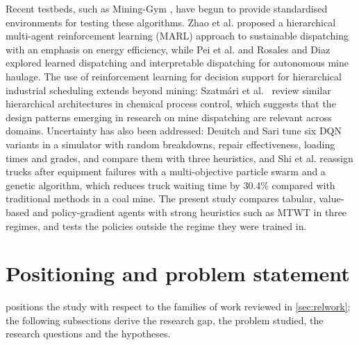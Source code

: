 \documentclass[11pt,a4paper]{article}
\newif\ifrevmarks
\newcommand{\revtag}[1]{\ifrevmarks\textsuperscript{\textcolor{red!70!black}{\scriptsize[#1]}}\fi}
\newcommand{\rev}[2]{\ifrevmarks{\color{revcolor}#2}\revtag{#1}\else#2\fi}
\newenvironment{revbloc}[1]{\par\ifrevmarks\color{revcolor}\noindent\revtag{#1}\ \fi}{\par}
\newif\ifcorrmarks
\newcommand{\corr}[1]{\ifcorrmarks\textcolor{corrcolor}{#1}\else#1\fi}
\begin{document}
Recent testbeds, such as Mining-Gym \cite{Banerjee2025}, have begun to provide standardised environments for testing these algorithms. Zhao et al. \cite{Zhao2025} proposed a hierarchical multi-agent reinforcement learning (MARL) approach to sustainable dispatching with an emphasis on energy efficiency, while Pei et al. \cite{Pei2025} and Rosales and Diaz \cite{FranciscoRosales2025} explored learned dispatching and interpretable dispatching for autonomous mine haulage. The use of reinforcement learning for decision support for hierarchical industrial scheduling extends beyond mining: \rev{v3}{Szatmári et al.~\cite{KingaSzatmari2025} review} similar hierarchical architectures in chemical process control, which suggests that the design patterns emerging in research on mine dispatching are relevant across domains. \corr{Uncertainty has also been addressed: Deuitch and Sari \cite{Deuitch2026} tune six DQN variants in a simulator with random breakdowns, repair effectiveness, loading times and grades, and compare them with three heuristics, and Shi et al. \cite{Shi2026} reassign trucks after equipment failures with a multi-objective particle swarm and a genetic algorithm, which reduces truck waiting time by 30.4\% compared with traditional methods in a coal mine. The present study compares tabular, value-based and policy-gradient agents with strong heuristics such as MTWT in three regimes, and tests the policies outside the regime they were trained in.}

\section{Positioning and problem statement}
\label{sec:positioning}

\begin{revbloc}{M24}
 positions the study with respect to the families of work reviewed in \cref{sec:relwork}; the following subsections derive the research gap, the problem studied, the research questions and the hypotheses.
\end{revbloc}
\end{document}
